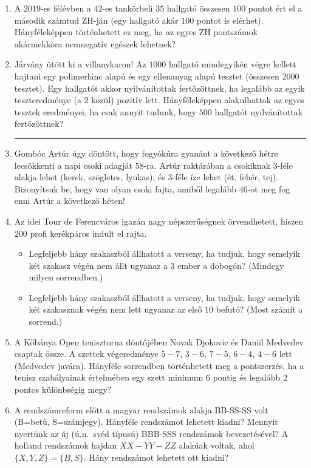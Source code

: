 \documentclass[a4paper,12pt]{article}
\begin{document}
\begin{enumerate}
        \item A $2019$-es félévben a $42$-es tankörbeli $35$ hallgató összesen $100$ pontot ért el a második számtud ZH-ján (egy hallgató akár $100$ pontot is elérhet). Hányféleképpen történhetett ez meg, ha az egyes ZH pontszámok akármekkora nemnegatív egészek lehetnek?

        \item Járvány ütött ki a villanykaron! Az $1000$ hallgató mindegyikén végre kellett hajtani egy polimerlánc alapú és egy ellenanyag alapú tesztet (összesen $2000$ tesztet). Egy hallgatót akkor nyilvánítottak fertőzöttnek, ha legalább az egyik teszteredménye (a $2$ közül) pozitív lett. Hányféleképpen alakulhattak az egyes tesztek eredményei, ha csak annyit tudunk, hogy $500$ hallgatót nyilvánítottak fertőzöttnek?

        \hrule

        \item Gombóc Artúr úgy döntött, hogy fogyókúra gyanánt a következő hétre lecsökkenti a napi csoki adagját $58$-ra. Artúr raktárában a csokiknak $3$-féle alakja lehet (kerek, szögletes, lyukas), és $3$-féle íze lehet (ét, fehér, tej). Bizonyítsuk be, hogy van olyan csoki fajta, amiből legalább $46$-ot meg fog enni Artúr a következő héten!
        
        \item Az idei Tour de Ferencváros igazán nagy népszerűségnek örvendhetett, hiszen $200$ profi kerékpáros indult el rajta.
            \begin{itemize}
                \item Legfeljebb hány szakaszból állhatott a verseny, ha tudjuk, hogy semelyik két szakasz végén nem állt ugyanaz a $3$ ember a dobogón? (Mindegy milyen sorrendben.)
                \item Legfeljebb hány szakaszból állhatott a verseny, ha tudjuk, hogy semelyik két szakasznak végén nem lett ugyanaz az első $10$ befutó? (Most számít a sorrend.)
            \end{itemize}
        
        \item A Kőbánya Open tenisztorna döntőjében Novak Djokovic és Daniil Medvedev csaptak össze. A szettek végeredménye $5-7$, $3-6$, $7-5$, $6-4$, $4-6$ lett (Medvedev javára). Hányféle sorrendben történhetett meg a pontszerzés, ha a tenisz szabályainak értelmében egy szett minimum $6$ pontig és legalább $2$ pontos különbségig megy?

        \item
        A rendszámreform előtt a magyar rendszámok alakja BB-SS-SS volt (B=betű,
        S=számjegy). 
        Hányféle rendszámot lehetett kiadni? Mennyit nyertünk az új (ú.n.\ svéd
        típusú) BBB-SSS rendszámok bevezetésével? A holland rendszámok hajdan $XX-YY-ZZ$
        alakúak voltak, ahol $\{X,Y,Z\}=\{B,S\}$. Hány rendszámot lehetett ott kiadni?


\end{enumerate}
\end{document}
